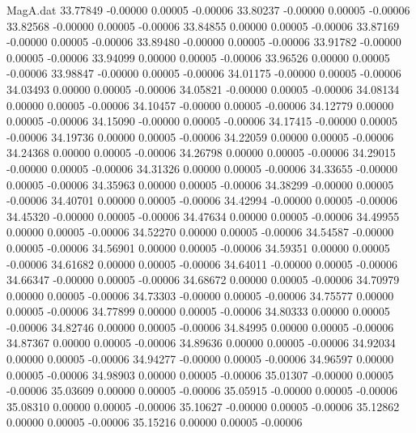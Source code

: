 \begin{filecontents}{MagA.dat}
  33.77849   -0.00000    0.00005   -0.00006
  33.80237   -0.00000    0.00005   -0.00006
  33.82568   -0.00000    0.00005   -0.00006
  33.84855    0.00000    0.00005   -0.00006
  33.87169   -0.00000    0.00005   -0.00006
  33.89480   -0.00000    0.00005   -0.00006
  33.91782   -0.00000    0.00005   -0.00006
  33.94099    0.00000    0.00005   -0.00006
  33.96526    0.00000    0.00005   -0.00006
  33.98847   -0.00000    0.00005   -0.00006
  34.01175   -0.00000    0.00005   -0.00006
  34.03493    0.00000    0.00005   -0.00006
  34.05821   -0.00000    0.00005   -0.00006
  34.08134    0.00000    0.00005   -0.00006
  34.10457   -0.00000    0.00005   -0.00006
  34.12779    0.00000    0.00005   -0.00006
  34.15090   -0.00000    0.00005   -0.00006
  34.17415   -0.00000    0.00005   -0.00006
  34.19736    0.00000    0.00005   -0.00006
  34.22059    0.00000    0.00005   -0.00006
  34.24368    0.00000    0.00005   -0.00006
  34.26798    0.00000    0.00005   -0.00006
  34.29015   -0.00000    0.00005   -0.00006
  34.31326    0.00000    0.00005   -0.00006
  34.33655   -0.00000    0.00005   -0.00006
  34.35963    0.00000    0.00005   -0.00006
  34.38299   -0.00000    0.00005   -0.00006
  34.40701    0.00000    0.00005   -0.00006
  34.42994   -0.00000    0.00005   -0.00006
  34.45320   -0.00000    0.00005   -0.00006
  34.47634    0.00000    0.00005   -0.00006
  34.49955    0.00000    0.00005   -0.00006
  34.52270    0.00000    0.00005   -0.00006
  34.54587   -0.00000    0.00005   -0.00006
  34.56901    0.00000    0.00005   -0.00006
  34.59351    0.00000    0.00005   -0.00006
  34.61682    0.00000    0.00005   -0.00006
  34.64011   -0.00000    0.00005   -0.00006
  34.66347   -0.00000    0.00005   -0.00006
  34.68672    0.00000    0.00005   -0.00006
  34.70979    0.00000    0.00005   -0.00006
  34.73303   -0.00000    0.00005   -0.00006
  34.75577    0.00000    0.00005   -0.00006
  34.77899    0.00000    0.00005   -0.00006
  34.80333    0.00000    0.00005   -0.00006
  34.82746    0.00000    0.00005   -0.00006
  34.84995    0.00000    0.00005   -0.00006
  34.87367    0.00000    0.00005   -0.00006
  34.89636    0.00000    0.00005   -0.00006
  34.92034    0.00000    0.00005   -0.00006
  34.94277   -0.00000    0.00005   -0.00006
  34.96597    0.00000    0.00005   -0.00006
  34.98903    0.00000    0.00005   -0.00006
  35.01307   -0.00000    0.00005   -0.00006
  35.03609    0.00000    0.00005   -0.00006
  35.05915   -0.00000    0.00005   -0.00006
  35.08310    0.00000    0.00005   -0.00006
  35.10627   -0.00000    0.00005   -0.00006
  35.12862    0.00000    0.00005   -0.00006
  35.15216    0.00000    0.00005   -0.00006

\end{filecontents}
